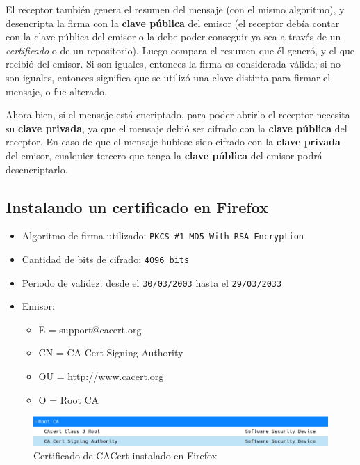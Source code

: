 El receptor también genera el resumen del mensaje (con el mismo algoritmo), y desencripta la firma con la \textbf{clave pública} del emisor (el receptor debía contar con la clave pública del emisor o la debe poder conseguir ya sea a través de un \emph{certificado} o de un repositorio). Luego compara el resumen que él generó, y el que recibió del emisor. Si son iguales, entonces la firma es considerada válida; si no son iguales, entonces significa que se utilizó una clave distinta para firmar el mensaje, o fue alterado.

Ahora bien, si el mensaje está encriptado, para poder abrirlo el receptor necesita su \textbf{clave privada}, ya que el mensaje debió ser cifrado con la \textbf{clave pública} del receptor. En caso de que el mensaje hubiese sido cifrado con la \textbf{clave privada} del emisor, cualquier tercero que tenga la \textbf{clave pública} del emisor podrá desencriptarlo.

\subsection{Instalando un certificado en Firefox}

\begin{itemize}
    \item Algoritmo de firma utilizado: \texttt{PKCS \#1 MD5 With RSA Encryption} 
    \item Cantidad de bits de cifrado: \texttt{4096 bits} 
    \item Periodo de validez: desde el \texttt{30/03/2003} hasta el \texttt{29/03/2033} 
    \item Emisor:
    \begin{itemize}
        \item E = support@cacert.org
        \item CN = CA Cert Signing Authority
        \item OU = http://www.cacert.org
        \item O = Root CA
    \end{itemize}
\end{itemize}

\begin{figure}[h]
    \centering
    \includegraphics[width=\linewidth]{images/arys-tp3-cacert-certificado-instalado.png}
    \caption*{Certificado de CACert instalado en Firefox}
\end{figure}

